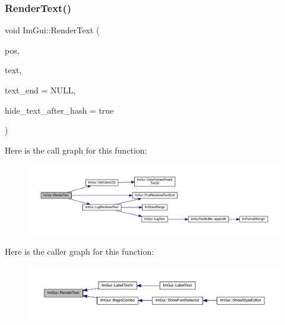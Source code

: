 \mbox{\label{namespace_im_gui_a9971ce57f2a288ac3a12df886c5550d1}} 
\subsubsection{\texorpdfstring{Render\+Text()}{RenderText()}}
{\footnotesize\ttfamily void Im\+Gui\+::\+Render\+Text (\begin{DoxyParamCaption}\item[{\mbox{\hyperlink{struct_im_vec2}{Im\+Vec2}}}]{pos,  }\item[{const char $\ast$}]{text,  }\item[{const char $\ast$}]{text\+\_\+end = {\ttfamily NULL},  }\item[{bool}]{hide\+\_\+text\+\_\+after\+\_\+hash = {\ttfamily true} }\end{DoxyParamCaption})}

Here is the call graph for this function\+:
\nopagebreak
\begin{figure}[H]
\begin{center}
\leavevmode
\includegraphics[width=350pt]{namespace_im_gui_a9971ce57f2a288ac3a12df886c5550d1_cgraph}
\end{center}
\end{figure}
Here is the caller graph for this function\+:
\nopagebreak
\begin{figure}[H]
\begin{center}
\leavevmode
\includegraphics[width=350pt]{namespace_im_gui_a9971ce57f2a288ac3a12df886c5550d1_icgraph}
\end{center}
\end{figure}
\mbox{\label{namespace_im_gui_ab362eafae794c7364a6b96ea06f38eb9}} 
